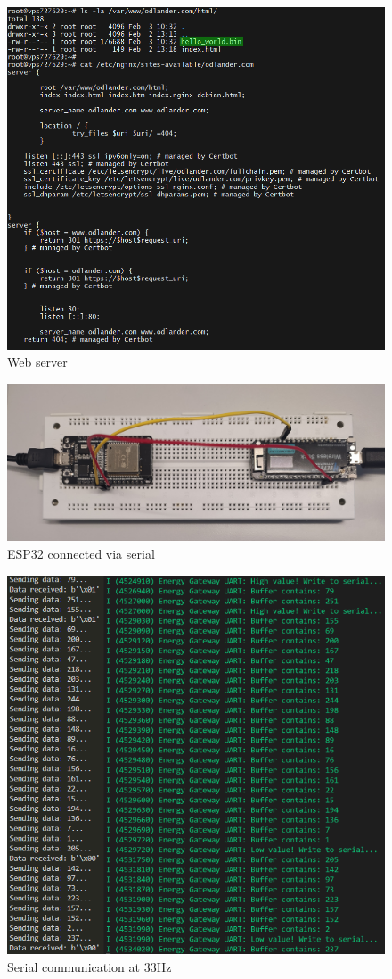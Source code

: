 \begin{figure}[h!]
  \centering
  \includegraphics[width=0.8\linewidth]{figures/web_server.png}
  \caption{Web server}
  \label{fig:web_server}
\end{figure}


\begin{figure}[h!]
  \centering
  \includegraphics[width=0.8\linewidth]{figures/serial_connection.jpg}
  \caption{ESP32 connected via serial}
  \label{fig:serial_connection}
\end{figure}

\begin{figure}[h!]
  \centering
  \includegraphics[width=0.8\linewidth]{figures/send_receive_33Hz.png}
  \caption{Serial communication at 33Hz}
  \label{fig:serial_communication_33hz}
\end{figure}

